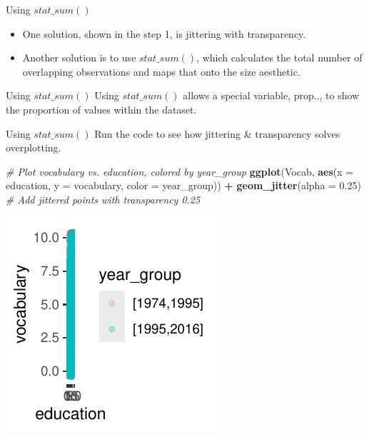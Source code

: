 \documentclass[
  ignorenonframetext,
]{beamer}
\newenvironment{Shaded}{\begin{snugshade}}{\end{snugshade}}
\newcommand{\AttributeTok}[1]{\textcolor[rgb]{0.13,0.29,0.53}{#1}}
\newcommand{\CommentTok}[1]{\textcolor[rgb]{0.56,0.35,0.01}{\textit{#1}}}
\newcommand{\FloatTok}[1]{\textcolor[rgb]{0.00,0.00,0.81}{#1}}
\newcommand{\FunctionTok}[1]{\textcolor[rgb]{0.13,0.29,0.53}{\textbf{#1}}}
\newcommand{\NormalTok}[1]{#1}
\newcommand{\SpecialCharTok}[1]{\textcolor[rgb]{0.81,0.36,0.00}{\textbf{#1}}}
\begin{document}
\begin{frame}{Using \(stat\_sum()\)}
\label{using-stat_sum-1}
\begin{itemize}
\item
  One solution, shown in the step 1, is jittering with transparency.
\item
  Another solution is to use \(stat\_sum()\), which calculates the total
  number of overlapping observations and maps that onto the size
  aesthetic.
\end{itemize}
\end{frame}

\begin{frame}{Using \(stat\_sum()\)}
\label{using-stat_sum-2}
Using \(stat\_sum()\) allows a special variable, prop.., to show the
proportion of values within the dataset.
\end{frame}

\begin{frame}[fragile]{Using \(stat\_sum()\)}
\label{using-stat_sum-3}
Run the code to see how jittering \& transparency solves overplotting.


\begin{Shaded}
\begin{Highlighting}[]
\CommentTok{\# Plot vocabulary vs. education, colored by year\_group}
\FunctionTok{ggplot}\NormalTok{(Vocab, }\FunctionTok{aes}\NormalTok{(}\AttributeTok{x =}\NormalTok{ education, }\AttributeTok{y =}\NormalTok{ vocabulary, }\AttributeTok{color =}\NormalTok{ year\_group)) }\SpecialCharTok{+}
    \FunctionTok{geom\_jitter}\NormalTok{(}\AttributeTok{alpha =} \FloatTok{0.25}\NormalTok{)  }\CommentTok{\# Add jittered points with transparency 0.25}
\end{Highlighting}
\end{Shaded}

\begin{center}\includegraphics[width=0.5\linewidth]{Figs/unnamed-chunk-20-1} \end{center}
\end{frame}
\end{document}
